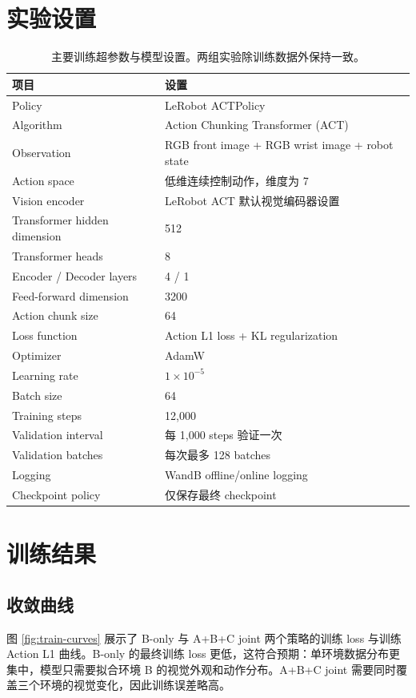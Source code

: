 \documentclass[10pt,a4paper]{ctexart}
\begin{document}
\section{实验设置}
\begin{table}[h]
\centering
\caption{主要训练超参数与模型设置。两组实验除训练数据外保持一致。}
\begin{tabularx}{\linewidth}{lX}
\toprule
\textbf{项目} & \textbf{设置} \\
\midrule
Policy & LeRobot ACTPolicy \\
Algorithm & Action Chunking Transformer (ACT) \\
Observation & RGB front image + RGB wrist image + robot state \\
Action space & 低维连续控制动作，维度为 7 \\
Vision encoder & LeRobot ACT 默认视觉编码器设置 \\
Transformer hidden dimension & 512 \\
Transformer heads & 8 \\
Encoder / Decoder layers & 4 / 1 \\
Feed-forward dimension & 3200 \\
Action chunk size & 64 \\
Loss function & Action L1 loss + KL regularization \\
Optimizer & AdamW \\
Learning rate & $1\times 10^{-5}$ \\
Batch size & 64 \\
Training steps & 12,000 \\
Validation interval & 每 1,000 steps 验证一次 \\
Validation batches & 每次最多 128 batches \\
Logging & WandB offline/online logging \\
Checkpoint policy & 仅保存最终 checkpoint \\
\bottomrule
\end{tabularx}
\end{table}

\section{训练结果}
\subsection{收敛曲线}
图 \ref{fig:train-curves} 展示了 B-only 与 A+B+C joint 两个策略的训练 loss 与训练 Action L1 曲线。B-only 的最终训练 loss 更低，这符合预期：单环境数据分布更集中，模型只需要拟合环境 B 的视觉外观和动作分布。A+B+C joint 需要同时覆盖三个环境的视觉变化，因此训练误差略高。
\end{document}
